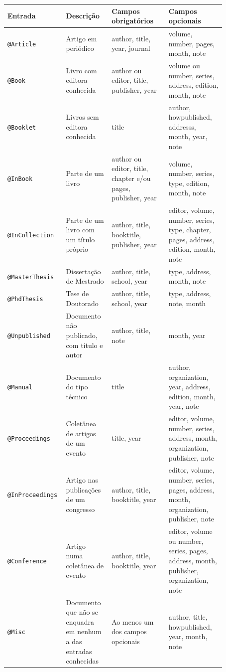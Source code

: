 \documentclass[fleqn]{profmat-cefet}
\begin{document}
\begin{small}%
\begin{spacing}{1}
\begin{longtable}{p{0.17\linewidth}p{0.2\linewidth}p{0.25\linewidth}p{0.25\linewidth}} \hline
  \textbf{Entrada}             &
  \textbf{Descrição}           &
  \textbf{Campos obrigatórios} &
  \textbf{Campos opcionais}    \\
  \hline \endhead
  \hline \endfoot
  \lstinline|@Article| & 
  Artigo em periódico &
  author, title, year, journal &
  volume, number, pages, month, note 
  \\[4mm]
  \lstinline|@Book| & 
  Livro com editora conhecida &
  author ou editor, title, publisher, year &
  volume ou number, series, address, edition, month, note 
  \\[4mm]
  \lstinline|@Booklet| & 
  Livros sem editora conhecida &
  title &
  author, howpublished, addresss, month, year, note 
  \\[4mm]
  \lstinline|@InBook| & 
  Parte de um livro &
  author ou editor, title, chapter e/ou pages, publisher, year & 
  volume, number, series, type, edition, month, note 
  \\[4mm]
  \lstinline|@InCollection| & 
  Parte de um livro com um título próprio &
  author, title, booktitle, publisher, year & 
  editor, volume, number, series, type, chapter, pages, address, edition, month, note 
  \\[4mm]
  \lstinline|@MasterThesis| & 
  Dissertação de Mestrado &
  author, title, school, year & 
  type, address, month, note 
  \\[4mm]
  \lstinline|@PhdThesis| & 
  Tese de Doutorado &
  author, title, school, year & 
  type, address, note, month 
  \\[4mm]
  \lstinline|@Unpublished| & 
  Documento não publicado, com título e autor&
  author, title, note &
  month, year 
  \\[4mm]
  \lstinline|@Manual| & 
  Documento do tipo técnico &
  title &
  author, organization, year, address, edition, month, year, note 
  \\[4mm]
  \lstinline|@Proceedings| & 
  Coletânea de artigos de um evento &
  title, year & 
  editor, volume, number, series, address, month, organization, publisher, note 
  \\[4mm]
  \lstinline|@InProceedings| & 
  Artigo nas publicações de um congresso &
  author, title, booktitle, year & 
  editor, volume, number, series, pages, address, month, organization, publisher, note 
  \\[4mm]
  \lstinline|@Conference| & 
  Artigo numa coletânea de evento &
  author, title, booktitle, year & 
  editor, volume ou number, series, pages, address, month, publisher, organization, note 
  \\[4mm]
  \lstinline|@Misc| & 
  Documento que não se enquadra em nenhum a das entradas conhecidas &
  Ao menos um dos campos opcionais &
  author, title, howpublished, year, month, note 
\end{longtable}%
\end{spacing}
\end{small}
\end{document}
